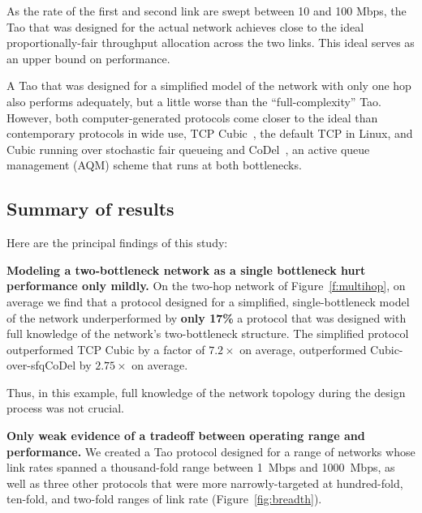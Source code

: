 As the rate of the first and second link are swept between 10 and 100
Mbps, the Tao that was designed for the actual network achieves close
to the ideal proportionally-fair throughput allocation across the two
links. This ideal serves as an upper bound on performance.

A Tao that was designed for a simplified model of the network with
only one hop also performs adequately, but a little worse than the
``full-complexity'' Tao. However, both computer-generated protocols
come closer to the ideal than contemporary protocols in wide use, TCP
Cubic~\cite{cubic}, the default TCP in Linux, and Cubic running over
stochastic fair queueing and CoDel~\cite{CoDel}, an active queue
management (AQM) scheme that runs at both bottlenecks.


\subsection{Summary of results}

Here are the principal findings of this study:

\vspace{\baselineskip}

\noindent 
\textbf{Modeling a two-bottleneck network as a single bottleneck hurt
  performance only mildly.}  On the two-hop network of
Figure~\ref{f:multihop}, on average we find that a protocol designed
for a simplified, single-bottleneck model of the network
underperformed by {\bf only 17\%} a protocol that was designed with
full knowledge of the network's two-bottleneck structure. The
simplified protocol outperformed TCP Cubic by a factor of $7.2\times$
on average, outperformed Cubic-over-sfqCoDel by $2.75\times$ on
average.

Thus, in this example, full knowledge of the network topology during
the design process was not crucial.

\vspace{\baselineskip}

\noindent 
\textbf{Only weak evidence of a tradeoff between
  operating range and performance.} We created a Tao protocol designed
for a range of networks whose link rates spanned a thousand-fold range
between 1~Mbps and 1000~Mbps, as well as three other protocols that
were more narrowly-targeted at hundred-fold, ten-fold, and two-fold
ranges of link rate (Figure~\ref{fig:breadth}).

